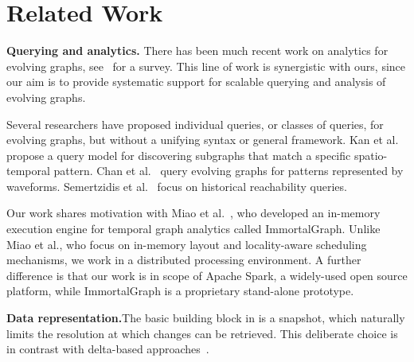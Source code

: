 \section{Related Work}
\label{sec:related}


{\bf Querying and analytics.} There has been much recent work on
analytics for evolving graphs,
see~\cite{DBLP:journals/csur/AggarwalS14} for a survey. This line of
work is synergistic with ours, since our aim is to provide systematic
support for scalable querying and analysis of evolving graphs.

Several researchers have proposed individual queries, or classes of
queries, for evolving graphs, but without a unifying syntax or general
framework.  Kan et al.~\cite{Kan2009} propose a query model for
discovering subgraphs that match a specific spatio-temporal pattern.
Chan et al.~\cite{Chan2008} query evolving graphs for patterns
represented by waveforms.  Semertzidis et al.~\cite{Semertzidis2015}
focus on historical reachability queries.

Our work shares motivation with Miao et
al.~\cite{DBLP:journals/tos/MiaoHLWYZPCC15}, who developed an
in-memory execution engine for temporal graph analytics called
ImmortalGraph.  Unlike Miao et al., who focus on in-memory layout and
locality-aware scheduling mechanisms, we work in a distributed
processing environment.  A further difference is that our work is in
scope of Apache Spark, a widely-used open source platform, while
ImmortalGraph is a proprietary stand-alone prototype.


{\bf Data representation.}The basic building block in \ql is a snapshot,
which naturally limits the resolution at which changes can be
retrieved. This deliberate choice is in contrast with delta-based
approaches~\cite{Khurana2013,Koloniari2012,DBLP:journals/tos/MiaoHLWYZPCC15}.

